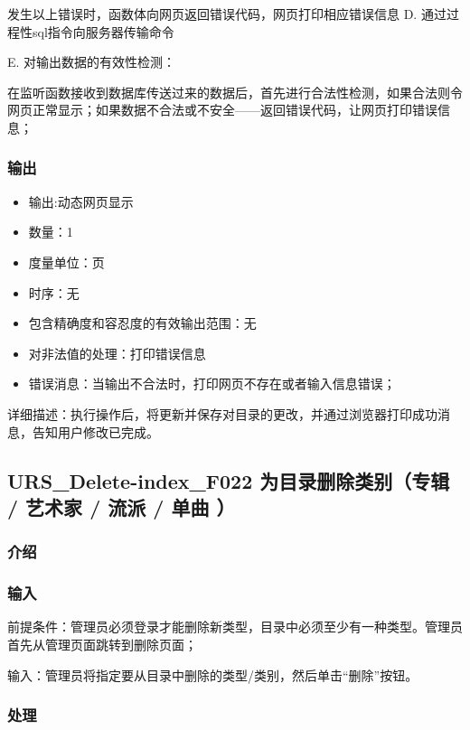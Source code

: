 	   发生以上错误时，函数体向网页返回错误代码，网页打印相应错误信息
   D. 通过过程性sql指令向服务器传输命令
		   
   E. 对输出数据的有效性检测：
   
   在监听函数接收到数据库传送过来的数据后，首先进行合法性检测，如果合法则令网页正常显示；如果数据不合法或不安全——返回错误代码，让网页打印错误信息；
   
   \subsubsection{输出}
   \begin{itemize}
	   \item	输出:动态网页显示
	   \item	数量：1
	   \item	度量单位：页
	   \item	时序：无
	   \item	包含精确度和容忍度的有效输出范围：无
	   \item	对非法值的处理：打印错误信息
	   \item	错误消息：当输出不合法时，打印网页不存在或者输入信息错误；
	  \end{itemize}
	  详细描述：执行操作后，将更新并保存对目录的更改，并通过浏览器打印成功消息，告知用户修改已完成。



	  \subsection{URS\_Delete-index\_F022 为目录删除类别（专辑 / 艺术家 / 流派 / 单曲 ）}
	  \subsubsection{介绍}
	  
	  \subsubsection{输入}
	  前提条件：管理员必须登录才能删除新类型，目录中必须至少有一种类型。管理员首先从管理页面跳转到删除页面；
   
	  输入：管理员将指定要从目录中删除的类型/类别，然后单击“删除”按钮。
	  
	  \subsubsection{处理}
	  
   
	  
